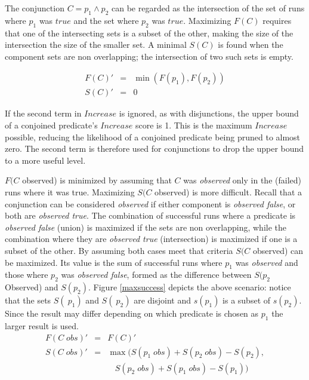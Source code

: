 The conjunction $C = p_1 \wedge p_2$ can be regarded as the intersection of the set of runs where $p_1$ was $true$ and the set where $p_2$ was $true$.  Maximizing $F(C)$ requires that one of the intersecting sets is a subset of the other, making the size of the intersection the size of the smaller set.  A minimal $S(C)$ is found when the component sets are non overlapping; the intersection of two such sets is empty.

\begin{eqnarray}
 \nonumber %
  F(C)' &=&  \min(F(p_1),F(p_2)) \\
 \nonumber
  S(C)' &=& 0
\end{eqnarray}

If the second term in $Increase$ is ignored, as with disjunctions, the upper bound of a conjoined predicate's $Increase$ score is 1.  This is the maximum $Increase$ possible, reducing the likelihood of a conjoined predicate being pruned to almost zero.  The second term is therefore used for conjunctions to drop the upper bound to a more useful level.

$F(C$ observed) is minimized by assuming that $C$ was \textit{observed} only in the (failed) runs where it was true.  Maximizing $S(C$ observed) is more difficult.  Recall that a conjunction can be considered \textit{observed} if either component is \textit{observed false}, or both are \textit{observed true}.  The combination of successful runs where a predicate is \textit{observed false} (union) is maximized if the sets are non overlapping, while the combination where they are \textit{observed true} (intersection) is maximized if one is a subset of the other.  By assuming both cases meet that criteria $S(C$ observed) can be maximized.  Its value is the sum of successful runs where $p_1$ was \textit{observed} and those where $p_2$ was \textit{observed false}, formed as the difference between $S(p_2$  Observed) and $S(p_2)$. Figure \ref{maxsuccess} depicts the above scenario: notice that the sets $S(~p_1)$ and $S(~p_2)$ are disjoint and $s(p_1)$ is a subset of $s(p_2)$.  Since the result may differ depending on which predicate is chosen as $p_1$ the larger result is used.
\begin{eqnarray}
 \nonumber
  F(C\;obs)' &=& F(C)' \\
 \nonumber
  S(C\;obs)' &=&
  \max(S(p_1\;obs)+S(p_2\;obs)-S(p_2),\\
 \nonumber
  & &\ \ \ \ S(p_2\;obs)+S(p_1\;obs)-S(p_1))
\end{eqnarray}

